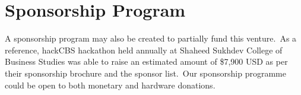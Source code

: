

\section{Sponsorship Program}\label{sec:sponsorships}

A sponsorship program may also be created to partially fund this venture.\ As a reference, hackCBS hackathon held
annually at Shaheed Sukhdev College of Business Studies was able to raise an estimated amount of \$7,900 USD as per
their sponsorship brochure and the sponsor list.\ Our sponsorship programme could be open to both monetary and hardware
donations.
